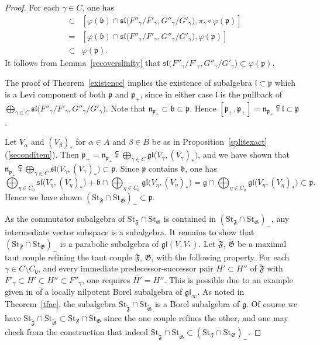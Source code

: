 \documentclass{article}
\newcommand {\St} {\mathrm{St}}
\def\b{\mathfrak {b}}
\def\gl{\mathfrak {gl}}
\def\g{\mathfrak {g}}
\def\l{\mathfrak {l}}
\def\n{\mathfrak {n}}
\def\p{\mathfrak {p}}
\def\sl{\mathfrak{sl}}
\def\F{\mathfrak{F}}
\def\G{\mathfrak{G}}
\begin{document}
\begin{proof}
For each $\gamma \in C$, one has 
\begin{eqnarray*}
[\varphi (\b) \cap \sl\big({F''_\gamma} / {F'_\gamma} , {G''_\gamma} / {G'_\gamma}\big) ,   \sl\big({F''_\gamma} / {F'_\gamma} , {G''_\gamma} / {G'_\gamma}\big) ]
& \subset &[\varphi (\b) \cap 
\sl\big({F''_\gamma} / {F'_\gamma} , {G''_\gamma} / {G'_\gamma}\big)
, \pi_\gamma \circ \varphi (\p) ] \\
&= &[\varphi (\b) \cap 
\sl\big({F''_\gamma} / {F'_\gamma} , {G''_\gamma} / {G'_\gamma}\big)
, \varphi( \p) ] \\
& \subset & \varphi(\p).
\end{eqnarray*}
It follows from Lemma~\ref{recoverslinfty} that
$\sl\big({F''_\gamma} / {F'_\gamma} , {G''_\gamma} / {G'_\gamma}\big)
\subset \varphi(\p)$.  

The proof of Theorem~\ref{existence} implies the existence of subalgebra $\l \subset \p$ which is a Levi component of both $\p$ and $\p_+$, since in either case $\l$ is the pullback of $\bigoplus_{\gamma \in C} \sl\big({F''_\gamma} / {F'_\gamma} , {G''_\gamma} / {G'_\gamma}\big)$.  Note that $\n_{\p_+} \subset \b \subset \p$.  Hence $[\p_+ , \p_+] = \n_{\p_+} \subsetplus \l \subset \p$.

Let $V_\alpha$ and $(V_\beta)_*$ for $\alpha \in A$ and $\beta \in B$ be as in Proposition~\ref{splitexact} (\ref{seconditem}).  Then $\p_+ = \n_{\p_+} \subsetplus \bigoplus_{\gamma \in C} \gl \big( V_\gamma , (V_\gamma)_* \big)$, and we have shown that $ \n_{\p_+} \subsetplus \bigoplus_{\gamma \in C} \sl \big( V_\gamma , (V_\gamma)_* \big) \subset \p$.  Since $\p$ contains $\b$, one has
$$\bigoplus_{\eta \in C_0} \sl \big( V_\eta , (V_\eta)_* \big) + \b \cap \bigoplus_{\eta \in C_0} \gl \big( V_\eta , (V_\eta)_* \big) = \g \cap \bigoplus_{\eta \in C_0} \gl \big( V_\eta , (V_\eta)_* \big) \subset \p.$$
Hence we have shown $(\St_\F \cap \St_\G)_- \subset \p$.

As the commutator subalgebra of $\St_\F \cap \St_\G$ is contained in $(\St_\F \cap \St_\G)_-$, any intermediate vector subspace is a subalgebra.  It remains to show that  $(\St_\F \cap \St_\G)_-$ is a parabolic subalgebra of $\gl(V,V_*)$.  Let $\tilde{\F}$, $\tilde{\G}$ be a maximal taut couple refining the taut couple $\F$, $\G$, with the following property.  For each $\gamma \in C \setminus C_0$, and every immediate predecessor-successor pair $H' \subset H''$ of $\tilde{\F}$ with $F'_\gamma \subset H' \subset H'' \subset F''_\gamma$, one requires $\overline{H'} = H''$.  This is possible due to an example given in \cite{DP2} of a locally nilpotent Borel subalgebra of $\gl_\infty$.  As noted in Theorem~\ref{tfae}, the subalgebra $\St_{\tilde{\F}} \cap \St_{\tilde{\G}}$ is a Borel subalgebra of $\g$.  Of course we have $\St_{\tilde{\F}} \cap \St_{\tilde{\G}} \subset \St_\F \cap \St_\G$ since the one couple refines the other, and one may check from the construction that indeed $\St_{\tilde{\F}} \cap \St_{\tilde{\G}}  \subset (\St_\F \cap \St_\G)_-$.  



\end{proof}
\end{document}
